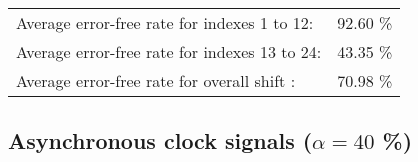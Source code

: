 \begin{table}[h]
\begin{center}
\begin{tabular}{|c|c|c|c|c|}
\end{tabular}


\flushleft
\begin{tabular}{l l}
Average error-free rate for indexes  1 to 12: &  92.60 \% \\
Average error-free rate for indexes 13 to 24: &  43.35 \% \\
Average error-free rate for overall shift   : &  70.98 \% \\

\end{tabular}


\end{center}
\end{table}


\pagebreak
\subsection{Asynchronous clock signals ($\alpha=40$ \%)}

